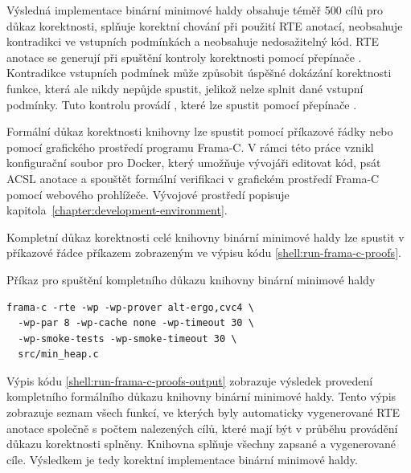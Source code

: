 Výsledná implementace binární minimové haldy obsahuje téměř 500 cílů pro důkaz korektnosti, splňuje korektní chování při použití RTE anotací, neobsahuje kontradikci ve vstupních podmínkách a neobsahuje nedosažitelný kód. RTE anotace se generují při spuštění kontroly korektnosti pomocí přepínače . Kontradikce vstupních podmínek může způsobit úspěšné dokázání korektnosti funkce, která ale nikdy nepůjde spustit, jelikož nelze splnit dané vstupní podmínky. Tuto kontrolu provádí , které lze spustit pomocí přepínače \mbox{}.

Formální důkaz korektnosti knihovny lze spustit pomocí příkazové řádky nebo pomocí grafického prostředí programu Frama-C. V rámci této práce vznikl konfigurační soubor pro Docker, který umožňuje vývojáři editovat kód, psát ACSL anotace a spouštět formální verifikaci v grafickém prostředí Frama-C pomocí webového prohlížeče. Vývojové prostředí popisuje kapitola~\ref{chapter:development-environment}.

Kompletní důkaz korektnosti celé knihovny binární minimové haldy lze spustit v příkazové řádce příkazem zobrazeným ve výpisu kódu \ref{shell:run-frama-c-proofs}.

\begin{listing}[H]
	\caption{Příkaz pro spuštění kompletního důkazu knihovny binární minimové haldy}
	\label{shell:run-frama-c-proofs}
	\begin{verbatim}
frama-c -rte -wp -wp-prover alt-ergo,cvc4 \
  -wp-par 8 -wp-cache none -wp-timeout 30 \
  -wp-smoke-tests -wp-smoke-timeout 30 \
  src/min_heap.c
	\end{verbatim}
\end{listing}

Výpis kódu \ref{shell:run-frama-c-proofs-output} zobrazuje výsledek provedení kompletního formálního důkazu knihovny binární minimové haldy. Tento výpis zobrazuje seznam všech funkcí, ve kterých byly automaticky vygenerované RTE anotace společně s počtem nalezených cílů, které mají být v průběhu provádění důkazu korektnosti splněny. Knihovna splňuje všechny zapsané a vygenerované cíle. Výsledkem je tedy korektní implementace binární minimové haldy.

